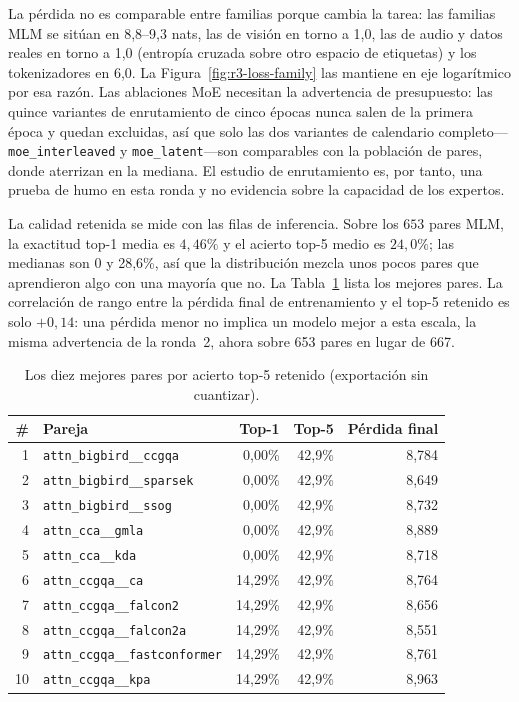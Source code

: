 La pérdida no es comparable entre familias porque cambia la tarea: las familias MLM se sitúan en 8,8--9,3 nats, las de visión en torno a 1,0, las de audio y datos reales en torno a 1,0 (entropía cruzada sobre otro espacio de etiquetas) y los tokenizadores en 6,0. La Figura~\ref{fig:r3-loss-family} las mantiene en eje logarítmico por esa razón. Las ablaciones MoE necesitan la advertencia de presupuesto: las quince variantes de enrutamiento de cinco épocas nunca salen de la primera época y quedan excluidas, así que solo las dos variantes de calendario completo---\texttt{moe\_interleaved} y \texttt{moe\_latent}---son comparables con la población de pares, donde aterrizan en la mediana. El estudio de enrutamiento es, por tanto, una prueba de humo en esta ronda y no evidencia sobre la capacidad de los expertos.

La calidad retenida se mide con las filas de inferencia. Sobre los $653$ pares MLM, la exactitud top-1 media es $4,46\%$ y el acierto top-5 medio es $24,0\%$; las medianas son 0 y 28,6\%, así que la distribución mezcla unos pocos pares que aprendieron algo con una mayoría que no. La Tabla~\ref{tab:r3-top-inference} lista los mejores pares. La correlación de rango entre la pérdida final de entrenamiento y el top-5 retenido es solo $+0,14$: una pérdida menor no implica un modelo mejor a esta escala, la misma advertencia de la ronda~2, ahora sobre 653 pares en lugar de 667.

\begin{table}[H]
\centering
\small
\caption{Los diez mejores pares por acierto top-5 retenido (exportación sin cuantizar).}
\label{tab:r3-top-inference}
\begin{tabular}{rlrrr}
\toprule
\# & Pareja & Top-1 & Top-5 & Pérdida final \\
\midrule
1 & \texttt{attn\_bigbird\_\_ccgqa} & 0,00\% & 42,9\% & 8,784 \\
2 & \texttt{attn\_bigbird\_\_sparsek} & 0,00\% & 42,9\% & 8,649 \\
3 & \texttt{attn\_bigbird\_\_ssog} & 0,00\% & 42,9\% & 8,732 \\
4 & \texttt{attn\_cca\_\_gmla} & 0,00\% & 42,9\% & 8,889 \\
5 & \texttt{attn\_cca\_\_kda} & 0,00\% & 42,9\% & 8,718 \\
6 & \texttt{attn\_ccgqa\_\_ca} & 14,29\% & 42,9\% & 8,764 \\
7 & \texttt{attn\_ccgqa\_\_falcon2} & 14,29\% & 42,9\% & 8,656 \\
8 & \texttt{attn\_ccgqa\_\_falcon2a} & 14,29\% & 42,9\% & 8,551 \\
9 & \texttt{attn\_ccgqa\_\_fastconformer} & 14,29\% & 42,9\% & 8,761 \\
10 & \texttt{attn\_ccgqa\_\_kpa} & 14,29\% & 42,9\% & 8,963 \\
\bottomrule
\end{tabular}
\end{table}

